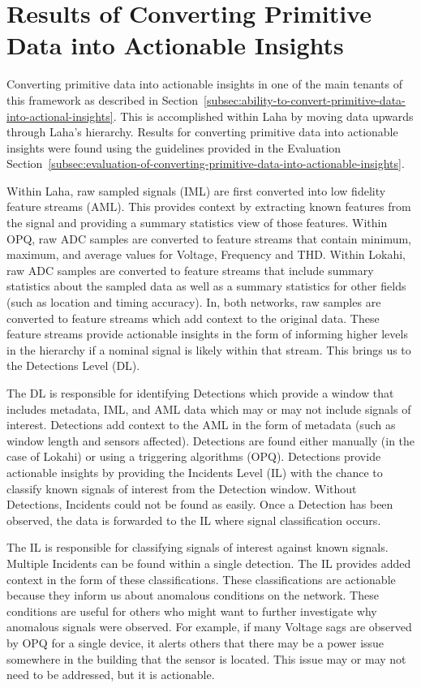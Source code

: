 \section{Results of Converting Primitive Data into Actionable Insights}\label{sec:results-of-converting-primitie-data-into-actional-insights}

Converting primitive data into actionable insights in one of the main tenants of this framework as described in Section~\ref{subsec:ability-to-convert-primitive-data-into-actional-insights}. This is accomplished within Laha by moving data upwards through Laha's hierarchy. Results for converting primitive data into actionable insights were found using the guidelines provided in the Evaluation Section~\ref{subsec:evaluation-of-converting-primitive-data-into-actionable-insights}.

Within Laha, raw sampled signals (IML) are first converted into low fidelity feature streams (AML). This provides context by extracting known features from the signal and providing a summary statistics view of those features. Within OPQ, raw ADC samples are converted to feature streams that contain minimum, maximum, and average values for Voltage, Frequency and THD. Within Lokahi, raw ADC samples are converted to feature streams that include summary statistics about the sampled data as well as a summary statistics for other fields (such as location and timing accuracy). In, both networks, raw samples are converted to feature streams which add context to the original data. These feature streams provide actionable insights in the form of informing higher levels in the hierarchy if a nominal signal is likely within that stream. This brings us to the Detections Level (DL).

The DL is responsible for identifying Detections which provide a window that includes metadata, IML, and AML data which may or may not include signals of interest. Detections add context to the AML in the form of metadata (such as window length and sensors affected). Detections are found either manually (in the case of Lokahi) or using a triggering algorithms (OPQ). Detections provide actionable insights by providing the Incidents Level (IL) with the chance to classify known signals of interest from the Detection window. Without Detections, Incidents could not be found as easily. Once a Detection has been observed, the data is forwarded to the IL where signal classification occurs.

The IL is responsible for classifying signals of interest against known signals. Multiple Incidents can be found within a single detection. The IL provides added context in the form of these classifications. These classifications are actionable because they inform us about anomalous conditions on the network. These conditions are useful for others who might want to further investigate why anomalous signals were observed. For example, if many Voltage sags are observed by OPQ for a single device, it alerts others that there may be a power issue somewhere in the building that the sensor is located. This issue may or may not need to be addressed, but it is actionable.

